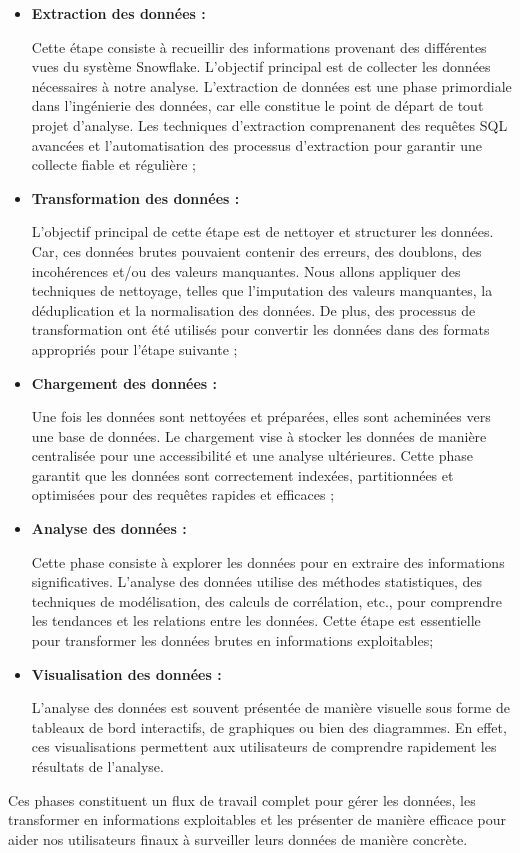   \begin{itemize}
  
  \item \textbf{Extraction des données :}
  \par Cette étape consiste à recueillir des informations provenant des différentes vues du système Snowflake. 
  L'objectif principal est de collecter les données nécessaires à notre analyse. 
  L'extraction de données est une phase primordiale dans l'ingénierie des données, car elle constitue le point de départ de tout projet d'analyse. 
  Les techniques d'extraction comprenanent des requêtes SQL avancées et l'automatisation des processus d'extraction pour garantir une collecte fiable et régulière ;

  \item \textbf{Transformation des données :}
  \par L'objectif principal de cette étape est de nettoyer et structurer les données. Car, ces données brutes pouvaient contenir des erreurs, des doublons, des incohérences et/ou des valeurs manquantes. 
  Nous allons appliquer des techniques de nettoyage, telles que l'imputation des valeurs manquantes, la déduplication et la normalisation des données.
   De plus, des processus de transformation ont été utilisés pour convertir les données dans des formats appropriés pour l'étape suivante ;

  \item \textbf{Chargement des données :}
  \par Une fois les données sont nettoyées et préparées, elles sont acheminées vers une base de données. 
  Le chargement vise à stocker les données de manière centralisée pour une accessibilité et une analyse ultérieures.
   Cette phase garantit que les données sont correctement indexées, partitionnées et optimisées pour des requêtes rapides et efficaces ;

  \item \textbf{Analyse des données :}
  \par Cette phase consiste à explorer les données pour en extraire des informations significatives. 
  L'analyse des données utilise des méthodes statistiques, des techniques de modélisation, des calculs de corrélation, etc., pour comprendre les tendances et les relations entre les données.
   Cette étape est essentielle pour transformer les données brutes en informations exploitables;

  \item \textbf{Visualisation des données :}
  \par L'analyse des données est souvent présentée de manière visuelle sous forme de tableaux de bord interactifs, de graphiques ou bien des diagrammes. En effet, ces visualisations permettent aux utilisateurs de comprendre rapidement les résultats de l'analyse. 

  \end{itemize}
  \par Ces phases constituent un flux de travail complet pour gérer les données, les transformer en informations exploitables et les présenter de manière efficace pour aider nos utilisateurs finaux à surveiller leurs données de manière concrète.

